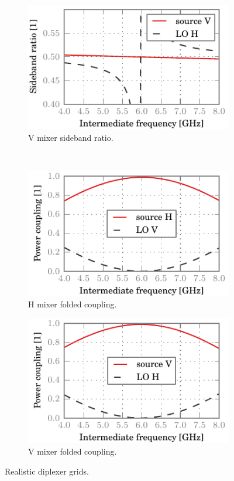 \begin{figure}[hbtp]
    \begin{subfigure}[b]{.5\textwidth}
        \includegraphics{chapter_3/02_realgrids_v_sbr}%
        \caption{V mixer sideband ratio.}
    \end{subfigure}%
    \\
    \begin{subfigure}[b]{.5\textwidth}
        \includegraphics{chapter_3/02_realgrids_h_ssb}%
        \caption{H mixer folded coupling.}
    \end{subfigure}%
    \begin{subfigure}[b]{.5\textwidth}
        \includegraphics{chapter_3/02_realgrids_v_ssb}%
        \caption{V mixer folded coupling.}
    \end{subfigure}%
    \caption{Realistic diplexer grids.}
    \label{fig:02_realgrids}
\end{figure}

